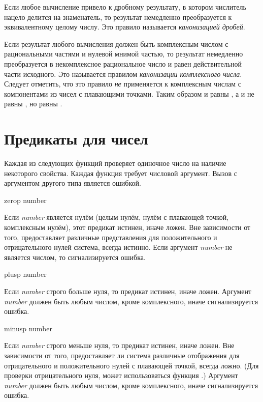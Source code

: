 Если любое вычисление привело к дробному результату, в котором числитель
нацело делится на знаменатель, то результат немедленно преобразуется к
эквивалентному целому числу. Это правило называется \emph{канонизацией дробей}.

Если результат любого вычисления должен быть комплексным числом с рациональными
частями и нулевой мнимой частью, то результат немедленно преобразуется в
некомплексное рациональное число и равен действительной части исходного.
Это называется правилом \emph{канонизации комплексного числа}.
Следует отметить, что это правило \emph{не} применяется к комплексным числам с
компонентами из чисел с плавающими точками. Таким образом  и 
равны , а  и  не равны , но равны
.

\section{Предикаты для чисел}

Каждая из следующих функций проверяет одиночное число на наличие некоторого
свойства.
Каждая функция требует числовой аргумент. Вызов с аргументом другого типа
является ошибкой.

\begin{defun}[Функция]
zerop number

Если \emph{number} является нулём (целым нулём, нулём с
плавающей точкой, комплексным нулём), этот предикат истинен, иначе ложен.
Вне зависимости от того, предоставляет различные представления для
положительного и отрицательного нулей система,  всегда истинно.
Если аргумент \emph{number} не является числом, то сигнализируется ошибка.
\end{defun}

\begin{defun}[Функция]
plusp number

Если \emph{number} строго больше нуля, то предикат истинен, иначе ложен.
Аргумент \emph{number} должен быть любым числом, кроме комплексного, иначе
сигнализируется ошибка. 
\end{defun}

\begin{defun}[Функция]
minusp number

Если \emph{number} строго меньше нуля, то предикат истинен, иначе ложен.
Вне зависимости от того, предоставляет ли система различные отображения для
отрицательного и положительного нулей с плавающей точкой, 
всегда ложно.
(Для проверки отрицательного нуля, может использоваться функция
.)
Аргумент \emph{number} должен быть любым числом, кроме комплексного, иначе
сигнализируется ошибка. 
\end{defun}

